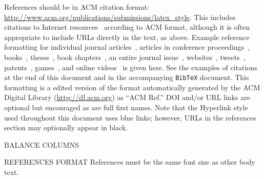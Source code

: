 \documentclass{sigchi}
\begin{document}
References should be in ACM citation format:
\url{http://www.acm.org/publications/submissions/latex_style}.  This
includes citations to Internet
resources~\cite{CHINOSAUR:venue,cavender:writing,psy:gangnam}
according to ACM format, although it is often appropriate to include
URLs directly in the text, as above. Example reference formatting for
individual journal articles~\cite{ethics}, articles in conference
proceedings~\cite{Klemmer:2002:WSC:503376.503378},
books~\cite{Schwartz:1995:GBF}, theses~\cite{sutherland:sketchpad},
book chapters~\cite{winner:politics}, an entire journal
issue~\cite{kaye:puc},
websites~\cite{acm_categories,cavender:writing},
tweets~\cite{CHINOSAUR:venue}, patents~\cite{heilig:sensorama}, 
games~\cite{supermetroid:snes}, and
online videos~\cite{psy:gangnam} is given here.  See the examples of
citations at the end of this document and in the accompanying
\texttt{BibTeX} document. This formatting is a edited version of the
format automatically generated by the ACM Digital Library
(\url{http://dl.acm.org}) as ``ACM Ref.'' DOI and/or URL links are
optional but encouraged as are full first names. Note that the
Hyperlink style used throughout this document uses blue links;
however, URLs in the references section may optionally appear in
black.

 BALANCE COLUMNS
\balance{}

 REFERENCES FORMAT
 References must be the same font size as other body text.


\end{document}
